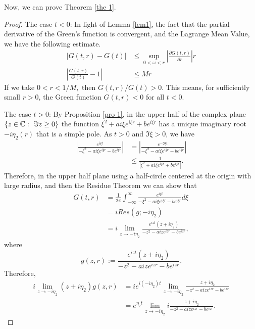 \documentclass[12pt,letterpaper]{amsart}
\theoremstyle{definition}
\theoremstyle{remark}
\numberwithin{equation}{section}
\begin{document}
Now, we can prove Theorem \ref{the 1}.
\begin{proof}
The case $t<0$: In light of Lemma \ref{lem1}, the fact that the partial derivative of the Green's function is convergent, and the Lagrange Mean Value, we have the following estimate.
\begin{align*}\left|G(t,r)-G(t)\right|&\le \sup_{0<\omega<r}\left|\frac{\partial G(t,r)}{\partial r}\right|r\\
 \left|\frac{G(t,r)}{G(t)}-1\right|&\le M r
 \end{align*}
If we take $0<r<{1}/{M},$ then ${G(t,r)}/{G(t)}>0.$ This means, for sufficiently small $r>0$, the Green function $G(t,r)<0$ for all $t<0$. 

\bigskip
The case $t>0$: By Proposition \ref{pro 1}, in the upper half of the complex plane $\{ z\in\mathbb C :\ \Im z\ge 0\}$ the function
$\xi^2+ai\xi e^{i\xi r}+be^{i\xi r}$ has a unique imaginary root $-i\eta_2(r)$ that is a simple pole. As $t>0$ and $\Im \xi >0$, we have
\begin{align*}
\left| \frac{e^{i\xi t}}{-\xi^2-ai\xi e^{i\xi r}-be^{i\xi r}} \right| &=  \left| \frac{e^{-\Im \xi t}}{-\xi^2-ai\xi e^{i\xi r}-be^{i\xi r}} \right|\\
&\le  \frac{1}{|\xi^2+ai\xi e^{i\xi r}+be^{i\xi r}|}.
\end{align*}
Therefore, in the upper half plane using a half-circle centered at the origin with large radius, and then the Residue Theorem we can show that
\begin{align}
 G(t,r) &=\frac{1}{2\pi}\int_{-\infty}^{\infty}\frac{e^{i\xi t}}{-\xi^2-ai\xi e^{i\xi r}-be^{i\xi r}}d\xi \nonumber \\
 &=i Res (g; -i\eta_2)\nonumber\\
 &= i\lim_{z\to-i\eta_2}  \frac{e^{iz t}(z+i\eta_2)}{-z^2-aize^{iz r}-be^{iz r}},
\end{align}
where
$$
g(z,r):= \frac{e^{iz t}(z+i\eta_2)}{-z^2-aize^{iz r}-be^{iz r}}.
$$
Therefore,
\begin{align}
i \lim_{z\to - i\eta_2} (z+i\eta_2) g(z,r) &=i e^{i(-i\eta_2) t}   \lim_{z\to - i\eta_2}   \frac{z+i\eta_2}{-z^2-aize^{iz r}-be^{iz r}}  \nonumber \\
&= e^{\eta_2 t}  \lim_{z\to - i\eta_2}   i\frac{z+i\eta_2}{-z^2-aize^{iz r}-be^{iz r}}  .
\end{align}


\end{proof}
\end{document}
